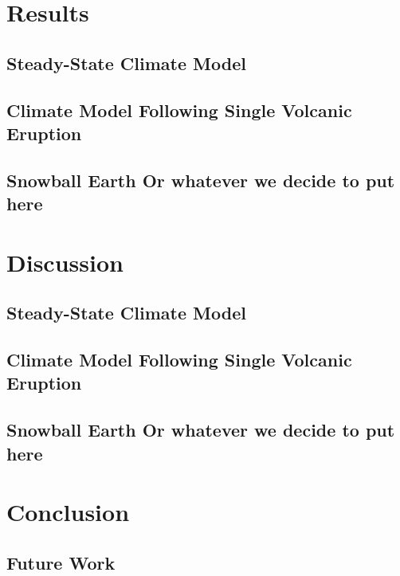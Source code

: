 \documentclass{article}
\begin{document}
\section{Results}
\subsection{Steady-State Climate Model}
\subsection{Climate Model Following Single Volcanic Eruption}
\subsection{Snowball Earth Or whatever we decide to put here}

\section{Discussion}
\subsection{Steady-State Climate Model}
\subsection{Climate Model Following Single Volcanic Eruption}
\subsection{Snowball Earth Or whatever we decide to put here}

\section{Conclusion}
\subsection{Future Work}

\newpage
\end{document}
